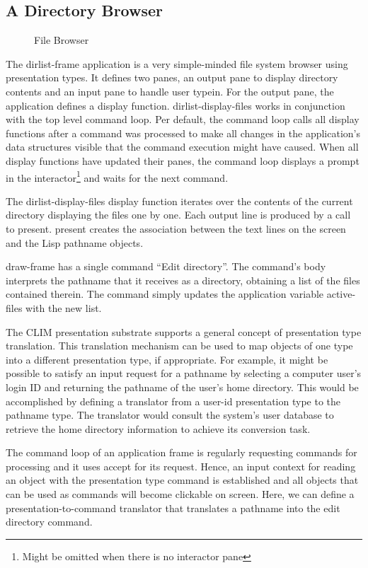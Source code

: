 \documentclass[twocolumn,a4paper]{article}
\newcommand {\code}[1]{{\sffamily #1}}
\newcommand {\CLIM}{{\small CLIM}}
\let\class\code
\let\method\code
\let\variable\code
\begin{document}
\subsection{A Directory Browser}
\begin{figure*}
\lstset{style=framestyle}

\caption{File Browser}\label{fig-file-browser}
\end{figure*}

The \class{dirlist-frame} application is a very simple-minded file
system browser using presentation types.  It defines two panes, an
output pane to display directory contents and an input pane to handle
user typein.  For the output pane, the application defines a display
function. \code{dirlist-display-files} works in conjunction with the
top level command loop. Per default, the command loop calls all
display functions after a command was processed to make all changes in
the application's data structures visible that the command execution
might have caused. When all display functions have updated their
panes, the command loop displays a prompt in the
interactor\footnote{Might be omitted when there is no interactor pane}
and waits for the next command.

The \method{dirlist-display-files} display function iterates over the
contents of the current directory displaying the files one by one.
Each output line is produced by a call to \method{present}.
\method{present} creates the association between the text lines on the
screen and the Lisp pathname objects.

\class{draw-frame} has a single command ``Edit directory''. The
command's body interprets the pathname that it receives as a
directory, obtaining a list of the files contained therein. The
command simply updates the application variable
\variable{active-files} with the new list.

The \CLIM{} presentation substrate supports a general concept of
presentation type translation. This translation mechanism can be used
to map objects of one type into a different presentation type, if
appropriate. For example, it might be possible to satisfy an input
request for a pathname by selecting a computer user's login ID and
returning the pathname of the user's home directory. This would be
accomplished by defining a translator from a user-id presentation type
to the pathname type. The translator would consult the system's user
database to retrieve the home directory information to achieve its
conversion task.

The command loop of an application frame is regularly requesting
commands for processing and it uses \method{accept} for its request.
Hence, an input context for reading an object with the presentation
type \class{command} is established and all objects that can be used
as commands will become clickable on screen. Here, we can define a
presentation-to-command translator that translates a pathname into the
edit directory command.
\end{document}
